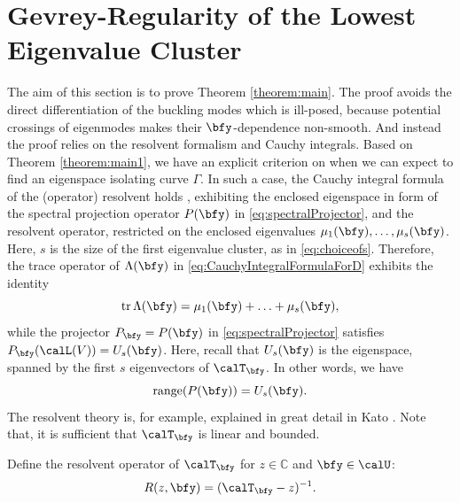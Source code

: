  \section{Gevrey-Regularity of the Lowest Eigenvalue Cluster}\label{sec:resolventChapter}
The aim of this section is to prove Theorem \ref{theorem:main}.
The proof avoids the direct differentiation of the buckling modes which is ill-posed, because potential crossings of eigenmodes makes their $\bfy$-dependence non-smooth.
And instead the proof relies on the resolvent formalism and Cauchy integrals.
Based on Theorem \ref{theorem:main1}, we have an explicit criterion on when we can expect to find an eigenspace isolating curve $\Gamma$.
In such a case, the Cauchy integral formula of the (operator) resolvent holds \cite[Chapter III, \S4 , Theorem 6.17]{kato1995perturbation}, exhibiting the enclosed eigenspace in form of the spectral projection operator $P(\bfy)$ in \eqref{eq:spectralProjector}, and the resolvent operator, restricted on the enclosed eigenvalues $\mu_1(\bfy), \ldots, \mu_s(\bfy)$. Here, $s$ is the size of the first eigenvalue cluster, as in \eqref{eq:choiceofs}. Therefore, the trace operator of $\Lambda(\bfy)$ in \eqref{eq:CauchyIntegralFormulaForD} exhibits the identity
\begin{equation}
    \mathrm{tr} \,\Lambda(\bfy) =  \mu_1(\bfy)+  \ldots + \mu_s(\bfy),
\end{equation}
while the projector $P_\bfy = P(\bfy)$ in \eqref{eq:spectralProjector} satisfies $P_\bfy (\calL(V)) = U_s(\bfy)$. Here, recall that $ U_s(\bfy)$ is the eigenspace, spanned by the first $s$ eigenvectors of $\calT_\bfy$. In other words, we have
\begin{equation*}
    \mathrm{range} (P(\bfy)) = U_s(\bfy).
\end{equation*}
The resolvent theory is, for example, explained in great detail in Kato \cite[Chapter I, \S 3 \& Chapter III, \S 4]{kato1995perturbation}. Note that, it is sufficient that $\calT_{\bfy}$ is linear and bounded.



Define the resolvent operator of $\calT_{\bfy}$ for $z \in \mathbb{C}$ and $\bfy \in \calU$:
\begin{equation}
    R(z,\bfy) = ( \calT_{\bfy} - z )^{-1}.
\end{equation}


